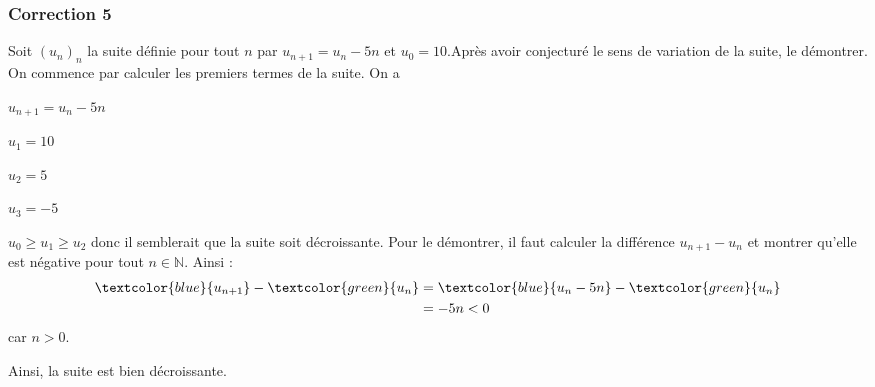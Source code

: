 \documentclass[15pt, mathserif]{beamer}
\newcommand{\N}{\mathbb{N}}			%
\begin{document}
\begin{frame}
\vspace{-10mm}
	\frametitle{Correction 5}
\bigskip 
 Soit $(u_n)_n$ la suite définie pour tout $n$ par $u_{n+1}=u_n-5n$ et $u_0=10$.Après avoir conjecturé le sens de variation de la suite, le démontrer. On commence par calculer les premiers termes de la suite. On a 
 \begin{multicols}{4} 
 $u_{n+1}=u_n-5n$ 
 
  \columnbreak 
 
 $u_1=10$ 
 
 \columnbreak 
 
 $u_2=5$ 
 
 \columnbreak 
 
 $u_3=-5$ 
  \end{multicols} $u_0 \geqslant u_1 \geqslant u_2$ donc il semblerait que la suite soit décroissante. Pour le démontrer, il faut calculer la différence $u_{n+1} -u_n$ et montrer qu'elle est négative pour tout $n \in \N$. Ainsi : \begin{align*} \textcolor{blue}{u_{n+1}}-\textcolor{green}{u_n} &=\textcolor{blue}{u_n-5n}-\textcolor{green}{u_n} \\ 
 &=-5n <0 
 \end{align*} car $n>0$. 
 
 Ainsi, la suite est bien décroissante. \end{frame}
\end{document}
